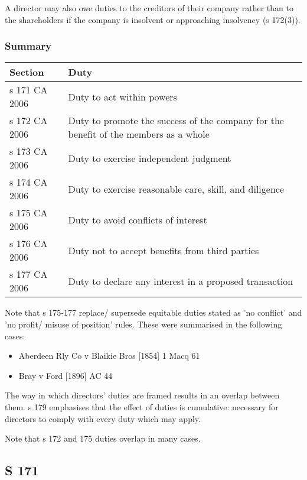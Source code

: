 \documentclass[
]{article}
\providecommand{\tightlist}{%
  \setlength{\itemsep}{0pt}\setlength{\parskip}{0pt}}
\begin{document}
A director may also owe duties to the creditors of their company rather
than to the shareholders if the company is insolvent or approaching
insolvency (s 172(3)).

\hypertarget{summary}{%
\subsubsection{Summary}\label{summary}}

\begin{longtable}[]{@{}ll@{}}
\toprule()
Section & Duty \\
\midrule()
\endhead
s 171 CA 2006 & Duty to act within powers \\
s 172 CA 2006 & Duty to promote the success of the company for the
benefit of the members as a whole \\
s 173 CA 2006 & Duty to exercise independent judgment \\
s 174 CA 2006 & Duty to exercise reasonable care, skill, and
diligence \\
s 175 CA 2006 & Duty to avoid conflicts of interest \\
s 176 CA 2006 & Duty not to accept benefits from third parties \\
s 177 CA 2006 & Duty to declare any interest in a proposed
transaction \\
\bottomrule()
\end{longtable}

Note that s 175-177 replace/ supersede equitable duties stated as 'no
conflict' and 'no profit/ misuse of position' rules. These were
summarised in the following cases:

\begin{itemize}
\tightlist
\item
  Aberdeen Rly Co v Blaikie Bros {[}1854{]} 1 Macq 61
\item
  Bray v Ford {[}1896{]} AC 44
\end{itemize}

The way in which directors' duties are framed results in an overlap
between them. s 179 emphasises that the effect of duties is cumulative:
necessary for directors to comply with every duty which may apply.

Note that s 172 and 175 duties overlap in many cases.

\hypertarget{s-171}{%
\subsection{S 171}\label{s-171}}
\end{document}

